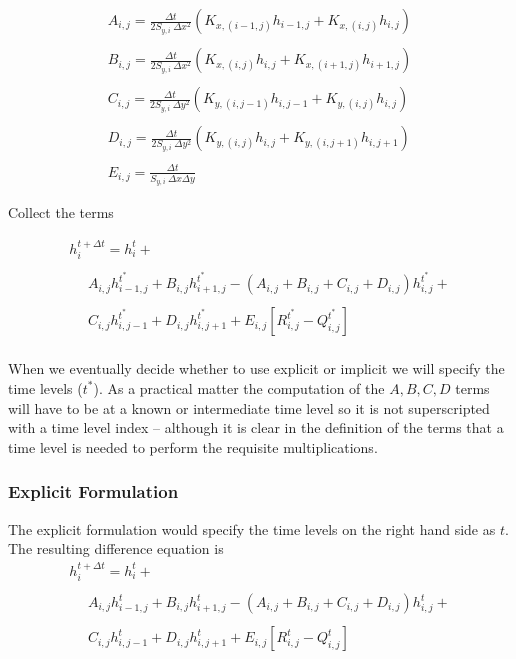 \begin{equation}
\begin{matrix}
A_{i,j} = \frac{\Delta t}{2 S_{y,i}~\Delta x^2}(K_{x,(i-1,j)} h_{i-1,j}+K_{x,(i,j)}h_{i,j}) \\ ~~ \\
B_{i,j} = \frac{\Delta t}{2 S_{y,i}~\Delta x^2}(K_{x,(i,j)}h_{i,j}+K_{x,(i+1,j)}h_{i+1,j})   \\ ~~ \\
C_{i,j} = \frac{\Delta t}{2 S_{y,i}~\Delta y^2}(K_{y,(i,j-1)}h_{i,j-1}+K_{y,(i,j)}h_{i,j})   \\ ~~ \\
D_{i,j} = \frac{\Delta t}{2 S_{y,i}~\Delta y^2}(K_{y,(i,j)}h_{i,j}+K_{y,(i,j+1)}h_{i,j+1})   \\ ~~ \\
E_{i,j} = \frac{\Delta t}{S_{y,i}~\Delta x \Delta y} 
\end{matrix}
\end{equation}

Collect the terms 

\begin{equation}
\begin{matrix}
h_i^{t+\Delta t} = h_i^{t} + \\
~~~~~~\\
~~~~~~   A_{i,j}h_{i-1,j}^{t^*} + B_{i,j}h_{i+1,j}^{t^*} - (A_{i,j}+B_{i,j}+C_{i,j}+D_{i,j})h_{i,j}^{t^*} + \\
~~~~~~\\
~~~~~~   C_{i,j}h_{i,j-1}^{t^*} + D_{i,j}h_{i,j+1}^{t^*} + E_{i,j}[R_{i,j}^{t^*}-Q_{i,j}^{t^*}]      \\
\end{matrix}        
\end{equation}

When we eventually decide whether to use explicit or implicit we will specify the time levels ($t^*$).   
As a practical matter the computation of the $A,B,C,D$ terms will have to be at a known or intermediate time level so it is not superscripted with a time level index -- although it is clear in the definition of the terms that a time level is needed to perform the requisite multiplications.

\subsubsection{Explicit Formulation}
The explicit formulation would specify the time levels on the right hand side as $t$.  
The resulting difference equation is
\begin{equation}
\begin{matrix}
h_i^{t+\Delta t} = h_i^{t} + \\
~~~~~~\\
~~~~~~   A_{i,j}h_{i-1,j}^{t} + B_{i,j}h_{i+1,j}^{t} - (A_{i,j}+B_{i,j}+C_{i,j}+D_{i,j})h_{i,j}^{t} + \\
~~~~~~\\
~~~~~~   C_{i,j}h_{i,j-1}^{t} + D_{i,j}h_{i,j+1}^{t} + E_{i,j}[R_{i,j}^{t}-Q_{i,j}^{t}]      \\
\end{matrix}        
\end{equation}

